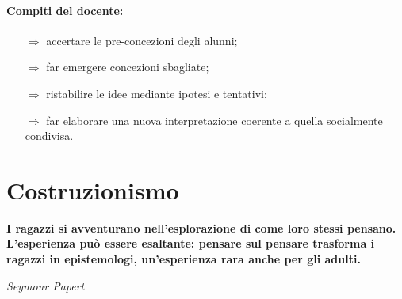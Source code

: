 
\paragraph{Compiti del docente:}

\begin{itemize}
    \item[$\Rightarrow$] accertare le pre-concezioni degli alunni;
    \item[$\Rightarrow$] far emergere concezioni sbagliate;
    \item[$\Rightarrow$] ristabilire le idee mediante ipotesi e tentativi;
    \item[$\Rightarrow$] far elaborare una nuova interpretazione coerente a quella socialmente condivisa.
\end{itemize}

\section{Costruzionismo}



\epigraph{\textbf{I ragazzi si avventurano nell'esplorazione di come loro stessi pensano. L'esperienza può essere esaltante: pensare sul pensare trasforma i ragazzi in epistemologi, un'esperienza rara anche per gli adulti.}}{\textit{Seymour Papert}}










